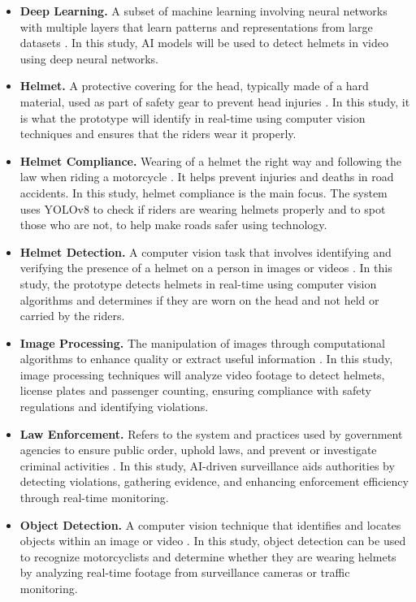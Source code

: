 \begin{refsection}
\begin{itemize}
    \item \textbf{Deep Learning.} A subset of machine learning involving neural networks with multiple layers that learn patterns and representations from large datasets \cite{Goodfellow2016}. In this study, AI models will be used to detect helmets in video using deep neural networks.


    \item \textbf{Helmet.} A protective covering for the head, typically made of a hard material, used as part of safety gear to prevent head injuries \cite{MerriamHelmet}. In this study, it is what the prototype will identify in real-time using computer vision techniques and ensures that the riders wear it properly.


    \item \textbf{Helmet Compliance.} Wearing of a helmet the right way and following the law when riding a motorcycle \cite{WHO2018}. It helps prevent injuries and deaths in road accidents. In this study, helmet compliance is the main focus. The system uses YOLOv8 to check if riders are wearing helmets properly and to spot those who are not, to help make roads safer using technology.


    \item \textbf{Helmet Detection.} A computer vision task that involves identifying and verifying the presence of a helmet on a person in images or videos \cite{Hayat2022}. In this study, the prototype detects helmets in real-time using computer vision algorithms and determines if they are worn on the head and not held or carried by the riders.


    \item \textbf{Image Processing.} The manipulation of images through computational algorithms to enhance quality or extract useful information \cite{Gonzalez2018}. In this study, image processing techniques will analyze video footage to detect helmets, license plates and passenger counting, ensuring compliance with safety regulations and identifying violations.


    \item \textbf{Law Enforcement.} Refers to the system and practices used by government agencies to ensure public order, uphold laws, and prevent or investigate criminal activities \cite{BritannicaLaw}. In this study, AI-driven surveillance aids authorities by detecting violations, gathering evidence, and enhancing enforcement efficiency through real-time monitoring.


    \item \textbf{Object Detection.} A computer vision technique that identifies and locates objects within an image or video \cite{Tian2019}. In this study, object detection can be used to recognize motorcyclists and determine whether they are wearing helmets by analyzing real-time footage from surveillance cameras or traffic monitoring.



\end{itemize}
\end{refsection}
